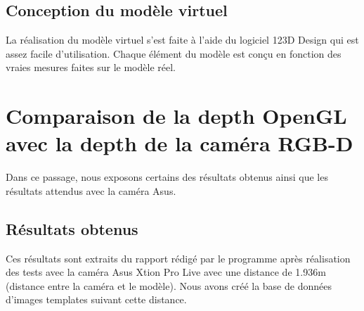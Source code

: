 \documentclass[a4paper, 12pt]{book}
\newcounter{program}[subsection]
\begin{document}
\subsection{Conception du modèle virtuel}
La réalisation du modèle virtuel s'est faite à l'aide du logiciel 123D Design qui est assez facile d'utilisation. Chaque élément du modèle est conçu en fonction des vraies mesures faites sur le modèle réel.

\section{Comparaison de la depth OpenGL avec la depth de la caméra RGB-D}
Dans ce passage, nous exposons certains des résultats obtenus ainsi que les résultats attendus avec la caméra Asus.
\subsection{Résultats obtenus}
Ces résultats sont extraits du rapport rédigé par le programme après réalisation des tests avec la caméra Asus Xtion Pro Live avec une distance de 1.936m (distance entre la caméra et le modèle). Nous avons créé la base de données d'images templates suivant cette distance.  \\ \\
\end{document}
